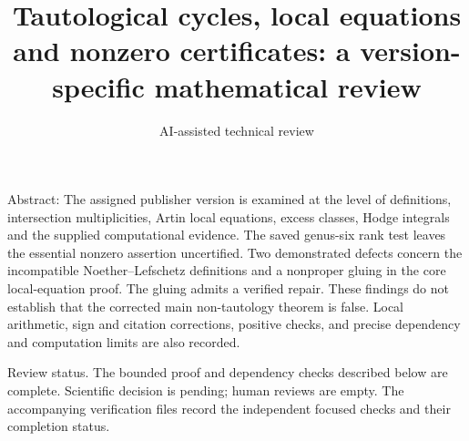 \documentclass[10pt]{article}
\title{Tautological cycles, local equations and nonzero certificates:
a version-specific mathematical review}
\author{AI-assisted technical review}
\date{}
\begin{document}
\maketitle
Abstract: The assigned publisher version is examined at the level of definitions, intersection multiplicities, Artin local equations, excess classes, Hodge integrals and the supplied computational evidence. The saved genus-six rank test leaves the essential nonzero assertion uncertified. Two demonstrated defects concern the incompatible Noether–Lefschetz definitions and a nonproper gluing in the core local-equation proof. The gluing admits a verified repair. These findings do not establish that the corrected main non-tautology theorem is false. Local arithmetic, sign and citation corrections, positive checks, and precise dependency and computation limits are also recorded.\par
Review status. The bounded proof and dependency checks described below are complete. Scientific decision is pending; human reviews are empty. The accompanying verification files record the independent focused checks and their completion status.\par
\end{document}
